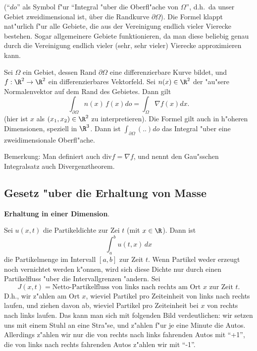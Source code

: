 (``$do$'' als Symbol f"ur ``Integral "uber die Oberfl"ache von $\Omega$'', d.h.\ da unser Gebiet 
zweidimensional ist, \"uber die Randkurve $\partial\Omega$). 
Die Formel klappt nat"urlich f"ur alle Gebiete, die aus der Vereinigung endlich 
vieler Vierecke bestehen. Sogar allgemeinere Gebiete funktionieren, da man diese 
beliebig genau durch die Vereinigung endlich vieler (sehr, sehr vieler) Vierecke 
approximieren kann.
\begin{satz} Sei $\Omega$ ein Gebiet, dessen Rand $\partial\Omega$ eine 
differenzierbare Kurve bildet, und $f:\R^2\rightarrow\R^2$ ein 
differenzierbares Vektorfeld. Sei $n(x)\in\R^2$ der "au"sere Normalenvektor 
auf dem Rand des Gebietes.
Dann gilt
$$ \int_{\partial\Omega} n(x)\, f(x) do  = \int_\Omega \nabla f(x) dx.$$
(hier ist $x$ als $(x_1, x_2)\in\R^2$ zu interpretieren). Die Formel gilt auch 
in h"oheren Dimensionen, speziell in $\R^3$. Dann ist $\int_{\partial\Omega}(..)do$ 
das Integral "uber eine zweidimensionale Oberfl"ache. 
\end{satz}

Bemerkung: Man definiert auch $\mbox{div} f= \nabla f$, und nennt den 
Gau"sschen Integralsatz auch Divergenztheorem. 

\subsection{Gesetz "uber die Erhaltung von Masse}
{\bf Erhaltung in einer Dimension}.\par
Sei $u(x,t)$ die Partikeldichte zur Zei $t$ (mit $x\in\R$). Dann ist
$$  \int_a^bu(t,x)\, dx$$
die Partikelmenge im Intervall $[a,b]$ zur Zeit $t$. Wenn Partikel weder erzeugt 
noch vernichtet werden k"onnen, wird sich diese Dichte nur durch einen
Partikelfluss "uber die Intervallgrenzen "andern. Sei
$$ J(x,t) = \mbox{Netto-Partikelfluss von links nach rechts am Ort } x \mbox{ zur Zeit }t.$$
D.h., wir z"ahlen am Ort $x$, wieviel Partikel pro Zeiteinheit 
von links nach rechts laufen, und ziehen davon ab, wieviel Partikel pro Zeiteinheit 
bei $x$ von rechts nach links laufen. Das kann man sich mit folgenden Bild 
verdeutlichen: wir setzen uns mit einem Stuhl an eine Stra"se, und z"ahlen 
f"ur je 
eine Minute die Autos. Allerdings z"ahlen wir nur die von rechts nach links fahrenden 
Autos mit ``+1'', die von links nach rechts fahrenden Autos z"ahlen wir mit ``-1''.

